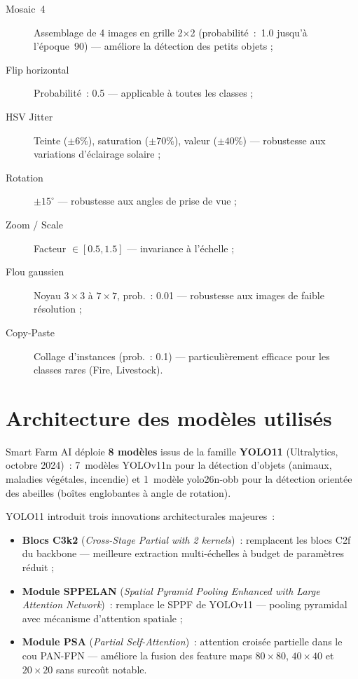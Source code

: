 \begin{description}
  \item[Mosaic~4] Assemblage de 4 images en grille 2$\times$2 (probabilité~:~1.0
        jusqu'à l'époque~90) --- améliore la détection des petits objets ;
  \item[Flip horizontal] Probabilité~: 0.5 --- applicable à toutes les classes ;
  \item[HSV Jitter] Teinte ($\pm6\%$), saturation ($\pm70\%$), valeur ($\pm40\%$)
        --- robustesse aux variations d'éclairage solaire ;
  \item[Rotation] $\pm15^{\circ}$ --- robustesse aux angles de prise de vue ;
  \item[Zoom / Scale] Facteur $\in [0.5, 1.5]$ --- invariance à l'échelle ;
  \item[Flou gaussien] Noyau $3\times3$ à $7\times7$, prob.~: 0.01 --- robustesse
        aux images de faible résolution ;
  \item[Copy-Paste] Collage d'instances (prob.~: 0.1) --- particulièrement efficace
        pour les classes rares (Fire, Livestock).
\end{description}

\section{Architecture des modèles utilisés}

Smart Farm AI déploie \textbf{8 modèles} issus de la famille \textbf{YOLO11}
(Ultralytics, octobre 2024)~: 7~modèles YOLOv11n pour la détection d'objets
(animaux, maladies végétales, incendie) et 1~modèle yolo26n-obb pour la détection
orientée des abeilles (boîtes englobantes à angle de rotation).

YOLO11 introduit trois innovations architecturales majeures~:
\begin{itemize}
  \item \textbf{Blocs C3k2} (\textit{Cross-Stage Partial with 2 kernels})~:
        remplacent les blocs C2f du backbone — meilleure extraction multi-échelles
        à budget de paramètres réduit ;
  \item \textbf{Module SPPELAN} (\textit{Spatial Pyramid Pooling Enhanced with Large
        Attention Network})~: remplace le SPPF de YOLOv11 — pooling pyramidal avec
        mécanisme d'attention spatiale ;
  \item \textbf{Module PSA} (\textit{Partial Self-Attention})~: attention croisée
        partielle dans le cou PAN-FPN — améliore la fusion des feature maps
        $80\!\times\!80$, $40\!\times\!40$ et $20\!\times\!20$ sans surcoût notable.
\end{itemize}

